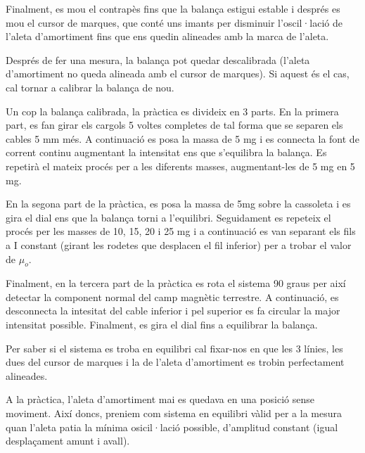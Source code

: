 \documentclass[11pt]{article}
\numberwithin{equation}{section}
\numberwithin{figure}{section}
\numberwithin{table}{section}
\begin{document}
Finalment, es mou el contrapès fins que la balança estigui estable i després es mou el cursor de marques, que conté uns imants per disminuir l'oscil·lació de l'aleta d'amortiment fins que ens quedin alineades amb la marca de l'aleta.

Després de fer una mesura, la balança pot quedar descalibrada (l'aleta d'amortiment no queda alineada amb el cursor de marques). Si aquest és el cas, cal tornar a calibrar la balança de nou.

Un cop la balança calibrada, la pràctica es divideix en 3 parts. En la primera part, es fan girar els cargols 5 voltes completes de tal forma que se separen els cables 5 mm més. A continuació es posa la massa de 5 mg i es connecta la font de corrent continu augmentant la intensitat ens que
s'equilibra la balança. Es repetirà el mateix procés per a les diferents masses, augmentant-les de 5 mg en 5 mg.

En la segona part de la pràctica, es posa la massa de 5mg sobre la cassoleta i es gira el dial ens que la balança torni a l'equilibri. Seguidament es repeteix el procés per les masses de 10, 15, 20 i 25 mg i a continuació es van separant els fils a I constant (girant les rodetes que desplacen el fil inferior) per a trobar el valor de $\mu_o$.

Finalment, en la tercera part de la pràctica es rota el sistema 90 graus per així detectar la component normal del camp magnètic terrestre. A continuació, es desconnecta la intesitat del cable inferior i pel superior es fa circular la major intensitat possible. Finalment, es gira el dial fins a equilibrar la balança.


Per saber si el sistema es troba en equilibri cal fixar-nos en que les 3 línies, les dues del cursor de marques i la de l'aleta d'amortiment es trobin perfectament alineades. 

A la pràctica, l'aleta d'amortiment mai es quedava en una posició sense moviment. Així doncs, preniem com sistema en equilibri vàlid per a la mesura quan l'aleta patia la mínima osicil·lació possible, d'amplitud constant (igual desplaçament amunt i avall).
\end{document}
